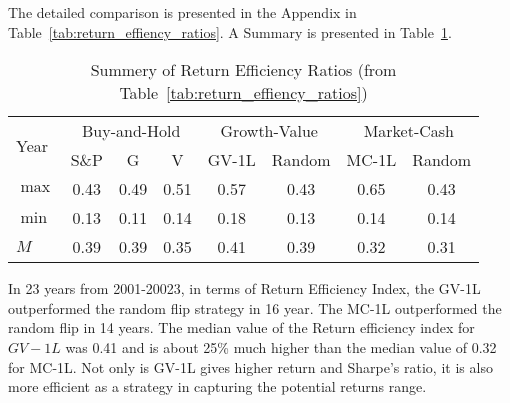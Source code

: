 \documentclass{article}
\begin{document}
The detailed comparison is presented in the Appendix in Table~\ref{tab:return_effiency_ratios}. A Summary is presented in
Table~\ref{tab:return_effiency_ratios_summary}.

\begin{table}[!ht]
    \centering
    \caption{Summery of Return Efficiency Ratios 
    (from Table~\ref{tab:return_effiency_ratios})}
    \begin{tabular}{l| ccc||cc||cc}
    \hline
    \multirow{2}{*}{Year} & \multicolumn{3}{c||}{Buy-and-Hold}   
& \multicolumn{2}{c||}{Growth-Value}  &  \multicolumn{2}{c}{Market-Cash}  \\\cline{2-8}
         & S\&P & G  & V & GV-1L& Random  & MC-1L& Random \\ \hline
        $\max$ & 0.43 & 0.49 & 0.51 & \cellcolor{green!25}0.57 & 0.43 & \cellcolor{green!25}0.65 & 0.43 \\ 
        $\min$ & 0.13 & 0.11 & 0.14 & \cellcolor{green!25}0.18 & 0.13 & \cellcolor{green!25}0.14 & 0.14 \\ 
        $M$ & 0.39 & 0.39 & 0.35 & \cellcolor{green!25}0.41 & 0.39 & \cellcolor{green!25}0.32 & 0.31 \\ 
\hline
    \end{tabular}
    \label{tab:return_effiency_ratios_summary}
\end{table}

In 23 years from 2001-20023,  in terms of Return Efficiency Index, the GV-1L outperformed the random flip strategy
in 16 year. The MC-1L outperformed the random flip in 14 years. The median value of the Return efficiency index for $GV-1L$ was
0.41 and is about 25\% much higher than the median value of 0.32 for MC-1L. Not only is GV-1L gives higher return and Sharpe's ratio, it is also more efficient as a strategy in capturing the potential returns range.
\end{document}
